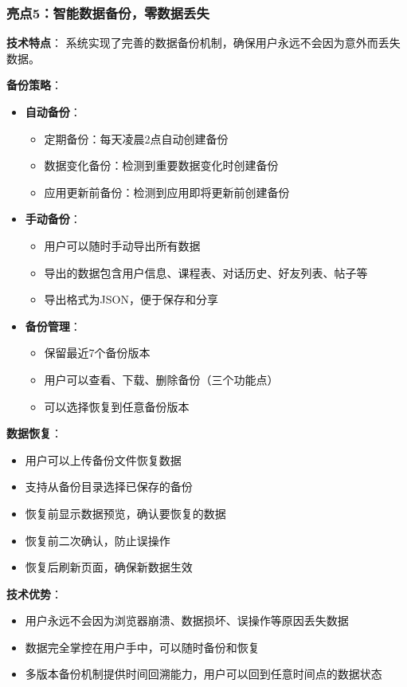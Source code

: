 \documentclass[12pt,a4paper]{article}
\begin{document}
\subsubsection{亮点5：智能数据备份，零数据丢失}

\textbf{技术特点}：
系统实现了完善的数据备份机制，确保用户永远不会因为意外而丢失数据。

\textbf{备份策略}：
\begin{itemize}
    \item \textbf{自动备份}：
        \begin{itemize}
            \item 定期备份：每天凌晨2点自动创建备份
            \item 数据变化备份：检测到重要数据变化时创建备份
            \item 应用更新前备份：检测到应用即将更新前创建备份
        \end{itemize}
    \item \textbf{手动备份}：
        \begin{itemize}
            \item 用户可以随时手动导出所有数据
            \item 导出的数据包含用户信息、课程表、对话历史、好友列表、帖子等
            \item 导出格式为JSON，便于保存和分享
        \end{itemize}
    \item \textbf{备份管理}：
        \begin{itemize}
            \item 保留最近7个备份版本
            \item 用户可以查看、下载、删除备份（三个功能点）
            \item 可以选择恢复到任意备份版本
        \end{itemize}
\end{itemize}

\textbf{数据恢复}：
\begin{itemize}
    \item 用户可以上传备份文件恢复数据
    \item 支持从备份目录选择已保存的备份
    \item 恢复前显示数据预览，确认要恢复的数据
    \item 恢复前二次确认，防止误操作
    \item 恢复后刷新页面，确保新数据生效
\end{itemize}

\textbf{技术优势}：
\begin{itemize}
    \item 用户永远不会因为浏览器崩溃、数据损坏、误操作等原因丢失数据
    \item 数据完全掌控在用户手中，可以随时备份和恢复
    \item 多版本备份机制提供时间回溯能力，用户可以回到任意时间点的数据状态
\end{itemize}
\end{document}
